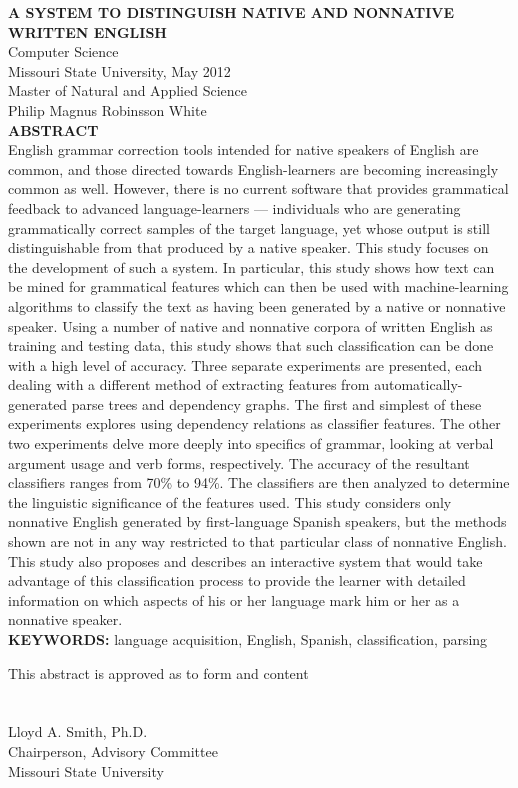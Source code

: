 \documentclass[main.tex]{subfiles}
\begin{document}
\noindent\textbf{A SYSTEM TO DISTINGUISH NATIVE AND NONNATIVE WRITTEN ENGLISH}\\
\noindent Computer Science\\
\noindent Missouri State University, May 2012\\
\noindent Master of Natural and Applied Science\\
\noindent Philip Magnus Robinsson White\\
\null
\noindent\textbf{ABSTRACT}\\
\singlespacing
\noindent English grammar correction tools intended for native speakers of English are common, and those directed towards English-learners are becoming increasingly common as well. However, there is no current software that provides grammatical feedback to advanced language-learners --- individuals who are generating grammatically correct samples of the target language, yet whose output is still distinguishable from that produced by a native speaker. This study focuses on the development of such a system. In particular, this study shows how text can be mined for grammatical features which can then be used with machine-learning algorithms to classify the text as having been generated by a native or nonnative speaker. Using a number of native and nonnative corpora of written English as training and testing data, this study shows that such classification can be done with a high level of accuracy. Three separate experiments are presented, each dealing with a different method of extracting features from automatically-generated parse trees and dependency graphs. The first and simplest of these experiments explores using dependency relations as classifier features. The other two experiments delve more deeply into specifics of grammar, looking at verbal argument usage and verb forms, respectively. The accuracy of the resultant classifiers ranges from 70\% to 94\%. The classifiers are then analyzed to determine the linguistic significance of the features used. This study considers only nonnative English generated by first-language Spanish speakers, but the methods shown are not in any way restricted to that particular class of nonnative English. This study also proposes and describes an interactive system that would take advantage of this classification process to provide the learner with detailed information on which aspects of his or her language mark him or her as a nonnative speaker.\\
\null
\noindent \textbf{KEYWORDS:} language acquisition, English, Spanish, classification, parsing\\
\null
\null
\raggedleft
\begin{minipage}[b]{3.5in}
This abstract is approved as to form and content\\\\

\makebox[3.5in]{\hrulefill}\\
Lloyd A. Smith, Ph.D.\\
Chairperson, Advisory Committee\\
Missouri State University
\end{minipage}
\end{document}
